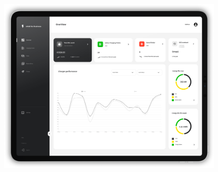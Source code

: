 \begin{figure}[H]
{        \includegraphics[scale=0.28]{src/mockups/business_dashboard.png}
    }
    \newline
\end{figure}

